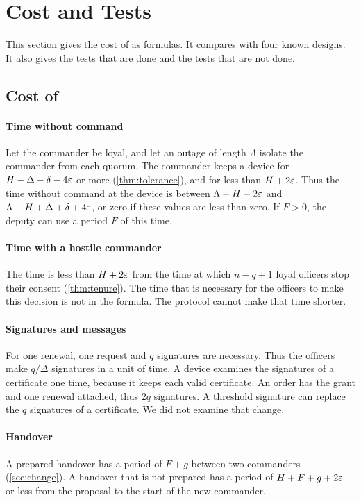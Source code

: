 \section{Cost and Tests}
\label{sec:cost}

This section gives the cost of \sys{} as formulas. It compares \sys{} with four known
designs. It also gives the tests that are done and the tests that are not done.

\subsection{Cost of \sys{}}

\paragraph{Time without command}
Let the commander be loyal, and let an outage of length $\Lambda$ isolate the commander
from each quorum. The commander keeps a device for $H - \Delta - \delta - 4\varepsilon$ or more
(\cref{thm:tolerance}), and for less than $H + 2\varepsilon$. Thus the time without command at the
device is between $\Lambda - H - 2\varepsilon$ and $\Lambda - H + \Delta + \delta + 4\varepsilon$, or zero
if these values are less than zero. If $F > 0$, the deputy can use a period $F$ of this
time.

\paragraph{Time with a hostile commander}
The time is less than $H + 2\varepsilon$ from the time at which $n - q + 1$ loyal officers stop
their consent (\cref{thm:tenure}). The time that is necessary for the officers to make
this decision is not in the formula. The protocol cannot make that time shorter.

\paragraph{Signatures and messages}
For one renewal, one request and $q$ signatures are necessary. Thus the officers make
$q/\Delta$ signatures in a unit of time. A device examines the signatures of a certificate one time,
because it keeps each valid certificate. An order has the grant and one renewal attached,
thus $2q$ signatures. A threshold signature can replace the $q$ signatures of a
certificate. We did not examine that change.

\paragraph{Handover}
A prepared handover has a period of $F + g$ between two commanders (\cref{sec:change}). A
handover that is not prepared has a period of $H + F + g + 2\varepsilon$ or less from the proposal
to the start of the new commander.


